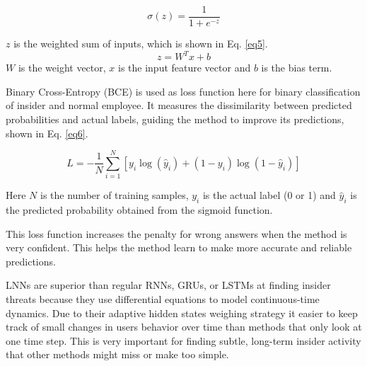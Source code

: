 \begin{equation}\label{eq4}
\sigma(z) = \frac{1}{1 + e^{-z}}
\end{equation}

\( z \) is the weighted sum of inputs, which is shown in Eq. \ref{eq5}.
\begin{equation}\label{eq5}
z = W^T x + b
\end{equation}
\( W \) is the weight vector, \( x \) is the input feature vector and \( b \) is the bias term.


Binary Cross-Entropy (BCE) is used as loss function here for binary classification of insider and normal employee. It measures the dissimilarity between predicted probabilities and actual labels, guiding the method to improve its predictions, shown in Eq. \ref{eq6}.

\begin{equation}\label{eq6}
L = - \frac{1}{N} \sum_{i=1}^{N} \left[ y_i \log(\hat{y}_i) + (1 - y_i) \log(1 - \hat{y}_i) \right]
\end{equation}

Here \( N \) is the number of training samples, \( y_i \) is the actual label (0 or 1) and \( \hat{y}_i \) is the predicted probability obtained from the sigmoid function.

This loss function increases the penalty for wrong answers when the method is very confident. This helps the method learn to make more accurate and reliable predictions.

LNNs are superior than regular RNNs, GRUs, or LSTMs at finding insider threats because they use differential equations to model continuous-time dynamics. Due to their adaptive hidden states weighing strategy it easier to keep track of small changes in users behavior over time than methods that only look at one time step. This is very important for finding subtle, long-term insider activity that other methods might miss or make too simple.
